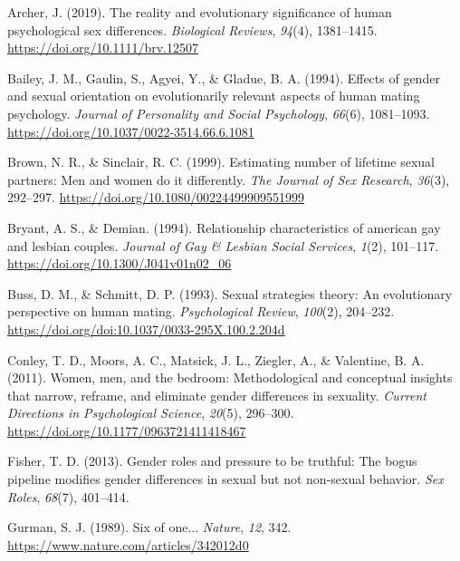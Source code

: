 \documentclass[
  11pt,
]{article}
\newlength{\cslhangindent}
\newlength{\cslentryspacingunit} %
\newenvironment{CSLReferences}[2] %
 {%
  \setlength{\parindent}{0pt}
  \ifodd #1
  \let\oldpar\par
  \def\par{\hangindent=\cslhangindent\oldpar}
  \fi
  \setlength{\parskip}{#2\cslentryspacingunit}
 }%
 {}
\begin{document}
\hypertarget{refs}{}
\begin{CSLReferences}{1}{0}
\leavevmode{}%
Archer, J. (2019). The reality and evolutionary significance of human
psychological sex differences. \emph{Biological Reviews}, \emph{94}(4),
1381--1415. \url{https://doi.org/10.1111/brv.12507}

\leavevmode{}%
Bailey, J. M., Gaulin, S., Agyei, Y., \& Gladue, B. A. (1994). Effects
of gender and sexual orientation on evolutionarily relevant aspects of
human mating psychology. \emph{Journal of Personality and Social
Psychology}, \emph{66}(6), 1081--1093.
\url{https://doi.org/10.1037/0022-3514.66.6.1081}

\leavevmode{}%
Brown, N. R., \& Sinclair, R. C. (1999). Estimating number of lifetime
sexual partners: Men and women do it differently. \emph{The Journal of
Sex Research}, \emph{36}(3), 292--297.
\url{https://doi.org/10.1080/00224499909551999}

\leavevmode{}%
Bryant, A. S., \& Demian. (1994). Relationship characteristics of
american gay and lesbian couples. \emph{Journal of Gay \& Lesbian Social
Services}, \emph{1}(2), 101--117.
\url{https://doi.org/10.1300/J041v01n02_06}

\leavevmode{}%
Buss, D. M., \& Schmitt, D. P. (1993). Sexual strategies theory: An
evolutionary perspective on human mating. \emph{Psychological Review},
\emph{100}(2), 204--232.
\url{https://doi.org/doi:10.1037/0033-295X.100.2.204d}

\leavevmode{}%
Conley, T. D., Moors, A. C., Matsick, J. L., Ziegler, A., \& Valentine,
B. A. (2011). Women, men, and the bedroom: Methodological and conceptual
insights that narrow, reframe, and eliminate gender differences in
sexuality. \emph{Current Directions in Psychological Science},
\emph{20}(5), 296--300. \url{https://doi.org/10.1177/0963721411418467}

\leavevmode{}%
Fisher, T. D. (2013). Gender roles and pressure to be truthful: The
bogus pipeline modifies gender differences in sexual but not non-sexual
behavior. \emph{Sex Roles}, \emph{68}(7), 401--414.

\leavevmode{}%
Gurman, S. J. (1989). Six of one... \emph{Nature}, \emph{12}, 342.
\url{https://www.nature.com/articles/342012d0}


\end{CSLReferences}
\end{document}
